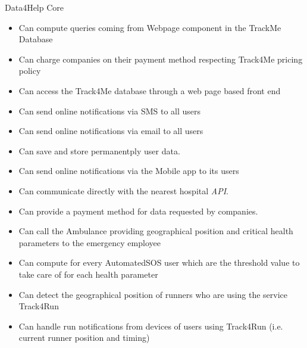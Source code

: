 \noindent Data4Help Core
\begin{itemize}
\item Can compute queries coming from Webpage component in the TrackMe Database
\item Can charge companies on their payment method respecting Track4Me pricing policy
\item Can access the Track4Me database through a web page based front end
\item Can send online notifications via SMS to all users 
\item Can send online notifications via email to all users
\item Can save and store permanentply user data.
\item Can send online notifications via the Mobile app to its users
\item Can communicate directly with the nearest hospital \textit{API}.
\item Can provide a payment method for data requested by companies.
\item Can call the Ambulance providing geographical position and critical health parameters to the emergency employee 
\item Can compute for every AutomatedSOS user which are the threshold value to take care of for each health parameter

\item Can detect the geographical position of runners who are using the service Track4Run
\item Can handle run notifications from devices of users using Track4Run (i.e. current runner position and timing)
\end{itemize}
